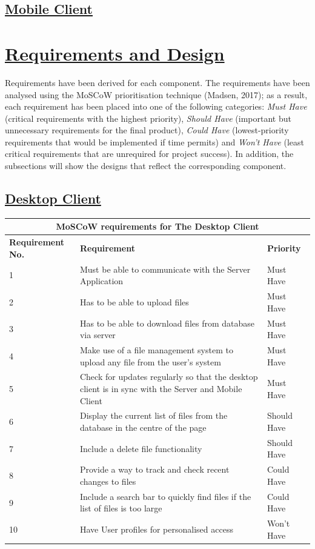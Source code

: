 \documentclass{article}
\begin{document}
\subsection{\underline{Mobile Client}}

\section{\underline{Requirements and Design}}
Requirements have been derived for each component. The requirements have been analysed using the MoSCoW prioritisation technique (Madsen, 2017); as a result, each requirement has been placed into one of the following categories: \textit{Must Have} (critical requirements with the highest priority), \textit{Should Have} (important but unnecessary requirements for the final product), \textit{Could Have} (lowest-priority requirements that would be implemented if time permits) and \textit{Won't Have} (least critical requirements that are unrequired for project success). In addition, the subsections will show the designs that reflect the corresponding component.

\subsection{\underline{Desktop Client}}
\begin{tabular}{|p{3cm}|p{5cm}|p{4cm}|}
\hline
\multicolumn{3}{|c|}{\textbf{MoSCoW requirements for The Desktop Client}} \\
\hline
\textbf{Requirement No.} & \textbf{Requirement} & \textbf{Priority}\\
\hline
1 & Must be able to communicate with the Server Application & Must Have \\
\hline
2 & Has to be able to upload files & Must Have \\
\hline
3 & Has to be able to download files from database via server & Must Have \\
\hline
4 & Make use of a file management system to upload any file from the user's system & Must Have \\
\hline
5 & Check for updates regularly so that the desktop client is in sync with the Server and Mobile Client & Must Have\\
\hline
6 & Display the current list of files from the database in the centre of the page & Should Have \\
\hline
7 & Include a delete file functionality   & Should Have \\
\hline
8 & Provide a way to track and check recent changes to files & Could Have\\
\hline
9 & Include a search bar to quickly find files if the list of files is too large & Could Have \\
\hline
10 & Have User profiles for personalised access & Won't Have \\
\hline
\end{tabular}
\end{document}
